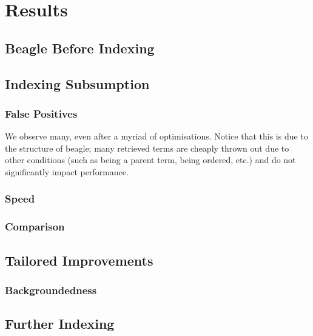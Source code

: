 
\chapter{Results}
\label{cha:results}

\section{Beagle Before Indexing}
\label{sec:preindexing}


\section{Indexing Subsumption}
\label{sec:indexresults}

\subsection{False Positives}

We observe many, even after a myriad of optimisations. Notice
that this is due to the structure of beagle; many retrieved terms
are cheaply thrown out due to other conditions (such as being a parent
term, being ordered, etc.) and do not significantly impact performance.

\subsection{Speed}

\subsection{Comparison}

\section{Tailored Improvements}
\label{sec:tailresults}

\subsection{Backgroundedness}

\section{Further Indexing}


